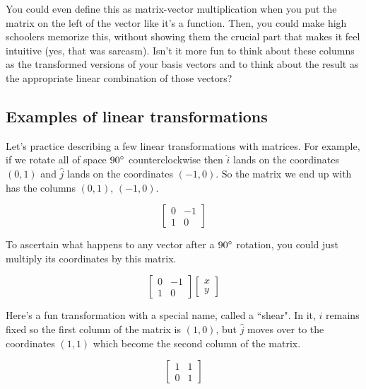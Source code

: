 You could even define this as matrix-vector multiplication when you put the
matrix on the left of the vector like it's a function. Then, you could make high
schoolers memorize this, without showing them the crucial part that makes it
feel intuitive (yes, that was sarcasm). Isn't it more fun to think about these
columns as the transformed versions of your basis vectors and to think about the
result as the appropriate linear combination of those vectors?

\subsection{Examples of linear transformations}

Let's practice describing a few linear transformations with matrices. For
example, if we rotate all of space $90\degree$ counterclockwise then $\hat{i}$
lands on the coordinates $(0, 1)$ and $\hat{j}$ lands on the coordinates
$(-1, 0)$. So the matrix we end up with has the columns $(0, 1)$, $(-1, 0)$.

\begin{equation*}
  \begin{bmatrix}
    0 & -1 \\
    1 & 0
  \end{bmatrix}
\end{equation*}

To ascertain what happens to any vector after a $90\degree$ rotation, you could
just multiply its coordinates by this matrix.

\begin{equation*}
  \begin{bmatrix}
    0 & -1 \\
    1 & 0
  \end{bmatrix} \begin{bmatrix}
    x \\
    y
  \end{bmatrix}
\end{equation*}

Here's a fun transformation with a special name, called a ``shear". In it,
$\hat{i}$ remains fixed so the first column of the matrix is $(1, 0)$, but
$\hat{j}$ moves over to the coordinates $(1, 1)$ which become the second column
of the matrix.

\begin{equation*}
  \begin{bmatrix}
    1 & 1 \\
    0 & 1
  \end{bmatrix}
\end{equation*}

